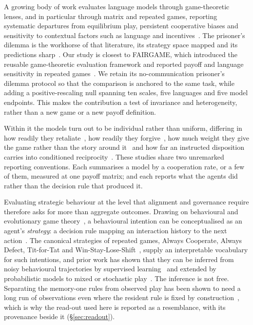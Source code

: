 \documentclass[openacc]{rsproca_new}
\begin{document}
A growing body of work evaluates language models through game-theoretic
lenses, and in particular through matrix and repeated games, reporting
systematic departures from equilibrium play, persistent cooperative biases and
sensitivity to contextual factors such as language and
incentives~\cite{buscemi2025fairgame,sun2025gtllm_survey,mao2025alympics,pal2026strategiescooperationdefectionlarge,willis2025will,fan2024can,pires2025large,fu2026optimal}.
The prisoner's dilemma is the workhorse of that literature, its strategy space
mapped and its predictions
sharp~\cite{axelrod1981evolution,axelrod1984evolution,nowak1992tit,nowak1993strategy,nowak2006five,pressDyson2012}.
Our study is closest to FAIRGAME, which introduced the reusable game-theoretic
evaluation framework and reported payoff and language sensitivity in repeated
games~\cite{buscemi2025fairgame}. We retain its no-communication prisoner's
dilemma protocol so that the comparison is anchored to the same task, while
adding a positive-rescaling null spanning ten scales, five languages and five
model endpoints. This makes the
contribution a test of invariance and heterogeneity, rather than a new game or
a new payoff definition.

Within it the models turn out to be individual rather than uniform, differing
in how readily they retaliate~\cite{akata2025}, how readily they
forgive~\cite{fontana2025nicer}, how much weight they give the game rather than
the story around it~\cite{loreheydari2024strategic} and how far an instructed
disposition carries into conditioned
reciprocity~\cite{phelps2023investigating}. These studies share two unremarked
reporting conventions. Each summarises a model by a cooperation rate, or a few
of them, measured at one payoff matrix; and each reports what the agents did
rather than the decision rule that produced it.

Evaluating strategic behaviour at the level that alignment and governance
require therefore asks for more than aggregate outcomes. Drawing on
behavioural and evolutionary game theory~\cite{sigmund:2010bo}, a behavioural
intention can be conceptualised as an agent's \emph{strategy}: a decision rule
mapping an interaction history to the next
action~\cite{han2011role,diStefanoIntention2023,Han2012ALIFEjournal,fujimoto2019functional}.
The canonical strategies of repeated games, Always Cooperate, Always Defect,
Tit-for-Tat and Win-Stay-Lose-Shift~\cite{Axelrod1980Effective,sigmund:2010bo},
supply an interpretable vocabulary for such intentions, and prior work has
shown that they can be inferred from noisy behavioural trajectories by
supervised learning~\cite{han2011role,diStefanoIntention2023} and extended by
probabilistic models to mixed or stochastic play~\cite{inferenceStrategies}.
The inference is not free. Separating the memory-one rules from observed play
has been shown to need a long run of observations even where the resident rule
is fixed by construction~\cite{kim2021win,hilbe2013memory}, which is why the
read-out used here is reported as a resemblance, with its provenance beside it
(\S\ref{sec:readout}).
\end{document}
